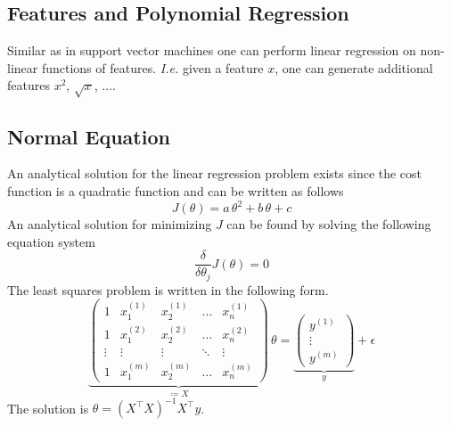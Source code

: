 \documentclass[a4paper,twoside,10pt]{article}
\begin{document}
\subsection{Features and Polynomial Regression}\label{cha:polyregression}
Similar as in support vector machines one can perform linear regression on non-linear functions of features.
\emph{I.e.} given a feature $x$, one can generate additional features $x^2$, $\sqrt x$, $\ldots$.

\subsection{Normal Equation}
An analytical solution for the linear regression problem exists since the cost function is a quadratic function and
can be written as follows
\begin{equation*}
  J(\theta)=a\,\theta^2+b\,\theta+c
\end{equation*}
An analytical solution for minimizing $J$ can be found by solving the following equation system
\begin{equation*}
  \frac{\delta}{\delta\theta_j}J(\theta)=0
\end{equation*}
The least squares problem is written in the following form.
\begin{equation*}
  \underbrace{\begin{pmatrix}
1&x^{(1)}_1&x^{(1)}_2&\hdots&x^{(1)}_n\\
1&x^{(2)}_1&x^{(2)}_2&\hdots&x^{(2)}_n\\
\vdots&\vdots&\vdots&\ddots&\vdots\\
1&x^{(m)}_1&x^{(m)}_2&\hdots&x^{(m)}_n
  \end{pmatrix}}_{\coloneqq X}\,\theta=
\underbrace{\begin{pmatrix}y^{(1)}\\\vdots\\y^{(m)}\end{pmatrix}}_{y}+\epsilon
\end{equation*}
The solution is $\theta=(X^\top X)^{-1}X^\top y$.
\end{document}
